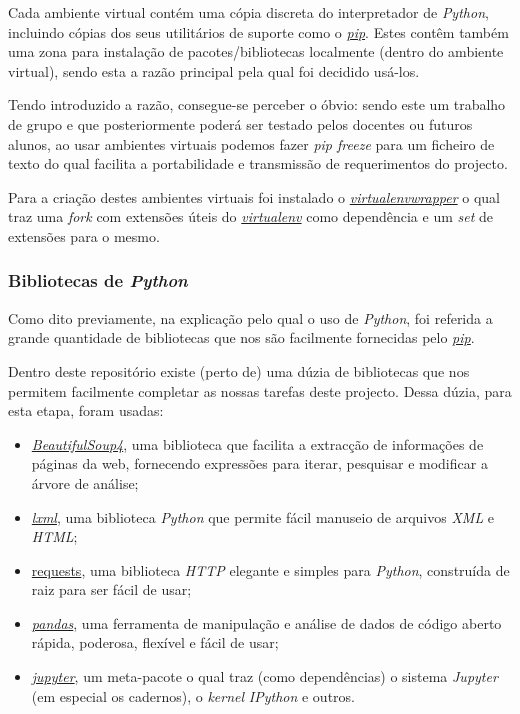 Cada ambiente virtual contém uma cópia discreta do interpretador de \textit{Python}, incluindo cópias dos seus utilitários de suporte como o \href{https://pypi.org/project/pip/}{\textit{pip}}. Estes contêm também uma zona para instalação de pacotes/bibliotecas localmente (dentro do ambiente virtual), sendo esta a razão principal pela qual foi decidido usá-los.

Tendo introduzido a razão, consegue-se perceber o óbvio: sendo este um trabalho de grupo e que posteriormente poderá ser testado pelos docentes ou futuros alunos, ao usar ambientes virtuais podemos fazer \textit{pip freeze} para um ficheiro de texto do qual facilita a portabilidade e transmissão de requerimentos do projecto.

Para a criação destes ambientes virtuais foi instalado o \href{https://pypi.org/project/virtualenvwrapper/}{\textit{virtualenvwrapper}} o qual traz uma \textit{fork} com extensões úteis do \href{https://pypi.org/project/virtualenv/}{\textit{virtualenv}} como dependência e um \textit{set} de extensões para o mesmo.

\subsubsection{Bibliotecas de \textit{Python}}
Como dito previamente, na explicação pelo qual o uso de \textit{Python}, foi referida a grande quantidade de bibliotecas que nos são facilmente fornecidas pelo \href{https://pypi.org/project/pip/}{\textit{pip}}.

Dentro deste repositório existe (perto de) uma dúzia de bibliotecas que nos permitem facilmente completar as nossas tarefas deste projecto. Dessa dúzia, para esta etapa, foram usadas:

\begin{itemize}
  \item \href{https://pypi.org/project/beautifulsoup4/}{\textit{BeautifulSoup4}}, uma biblioteca que facilita a extracção de informações de páginas da web, fornecendo expressões para iterar, pesquisar e modificar a árvore de análise;
  \item \href{https://pypi.org/project/lxml/}{\textit{lxml}}, uma biblioteca \textit{Python} que permite fácil manuseio de arquivos \textit{XML} e \textit{HTML};
  \item \href{https://pypi.org/project/requests/}{requests}, uma biblioteca \textit{HTTP} elegante e simples para \textit{Python}, construída de raiz para ser fácil de usar;
  \item \href{https://pypi.org/project/pandas/}{\textit{pandas}}, uma ferramenta de manipulação e análise de dados de código aberto rápida, poderosa, flexível e fácil de usar;
  \item \href{pip install jupyter}{\textit{jupyter}}, um meta-pacote o qual traz (como dependências) o sistema \textit{Jupyter} (em especial os cadernos), o \textit{kernel} \textit{IPython} e outros.
\end{itemize}

